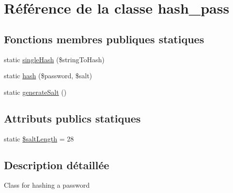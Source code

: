 \hypertarget{classhash__pass}{\section{Référence de la classe hash\-\_\-pass}
\label{classhash__pass}
}
\subsection*{Fonctions membres publiques statiques}
\begin{DoxyCompactItemize}
\item 
static \hyperlink{classhash__pass_ab78b0e97fa4011c89dd67040d1148d95}{single\-Hash} (\$string\-To\-Hash)
\item 
static \hyperlink{classhash__pass_a94a909b5298e713f595d6f94f076d3d6}{hash} (\$password, \$salt)
\item 
static \hyperlink{classhash__pass_acceb20069a0288c0b449b0633f04f7a5}{generate\-Salt} ()
\end{DoxyCompactItemize}
\subsection*{Attributs publics statiques}
\begin{DoxyCompactItemize}
\item 
static \hyperlink{classhash__pass_ab9a2aa06bf03e6f915433bc86fb730a2}{\$salt\-Length} = 28
\end{DoxyCompactItemize}


\subsection{Description détaillée}
Class for hashing a password 

